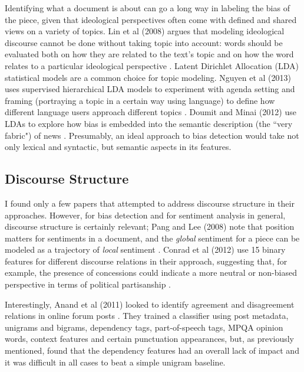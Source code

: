 \documentclass[11pt, a4paper]{article}
\begin{document}
Identifying what a document is about can go a long way in labeling the bias of the piece, given that ideological perspectives often come with defined and shared views on a variety of topics. Lin et al (2008) argues that modeling ideological discourse cannot be done without taking topic into account: words should be evaluated both on how they are related to the text's topic and on how the word relates to a particular ideological perspective \cite{lin2008jointtopic}. Latent Dirichlet Allocation (LDA) statistical models are a common choice for topic modeling. Nguyen et al (2013) uses supervised hierarchical LDA models to experiment with agenda setting and framing (portraying a topic in a certain way using language) to define how different language users approach different topics \cite{nguyen2013lexical}. Doumit and Minai (2012) use LDAs to explore how bias is embedded into the semantic description (the ``very fabric") of news \cite{doumit2012online}. Presumably, an ideal approach to bias detection would take not only lexical and syntactic, but semantic aspects in its features.

\subsection{Discourse Structure}

I found only a few papers that attempted to address discourse structure in their approaches. However, for bias detection and for sentiment analysis in general, discourse structure is certainly relevant; Pang and Lee (2008) note that position matters for sentiments in a document, and the \textit{global} sentiment for a piece can be modeled as a trajectory of \textit{local} sentiment \cite{pang2008opinion}. Conrad et al (2012) use 15 binary features for different discourse relations in their approach, suggesting that, for example, the presence of concessions could indicate a more neutral or non-biased perspective in terms of political partisanship \cite{conrad2012recognizing}.

Interestingly, Anand et al (2011) looked to identify agreement and disagreement relations in online forum posts \cite{anand2011classifying}. They trained a classifier using post metadata, unigrams and bigrams, dependency tags, part-of-speech tags, MPQA opinion words, context features and certain punctuation appearances, but, as previously mentioned, found that the dependency features had an overall lack of impact and it was difficult in all cases to beat a simple unigram baseline.
\end{document}
